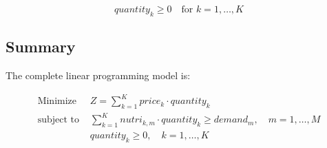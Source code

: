 \documentclass{article}
\begin{document}
\[
quantity_k \geq 0 \quad \text{for } k = 1, \ldots, K
\]

\subsection*{Summary}

The complete linear programming model is:

\begin{align*}
\text{Minimize } & Z = \sum_{k=1}^{K} price_k \cdot quantity_k \\
\text{subject to } & \sum_{k=1}^{K} nutri_{k,m} \cdot quantity_k \geq demand_m, \quad m = 1, \ldots, M \\
& quantity_k \geq 0, \quad k = 1, \ldots, K
\end{align*}
\end{document}
